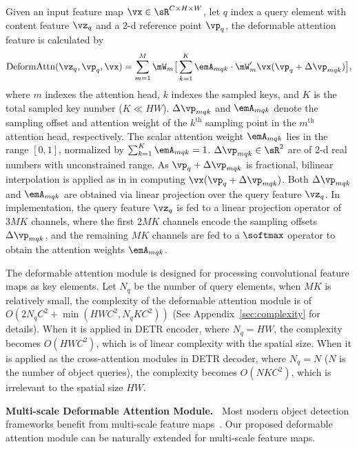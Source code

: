 Given an input feature map $\vx \in \sR^{C \times H \times W}$, let $q$ index a query element with content feature $\vz_q$ and a 2-d reference point $\vp_q$, the deformable attention feature is calculated by
\begin{equation}
\text{DeformAttn}(\vz_q, \vp_q, \vx) = \sum_{m=1}^{M} \mW_m \big[\sum_{k=1}^{K} \emA_{mqk} \cdot \mW'_m \vx(\vp_q + \Delta\vp_{mqk})\big],
\label{eq:single_deform_attn_fun}
\end{equation}
where $m$ indexes the attention head, $k$ indexes the sampled keys, and $K$ is the total sampled key number ($K \ll HW$).
$\Delta\vp_{mqk}$ and $\emA_{mqk}$ denote the sampling offset and attention weight of the $k^\text{th}$ sampling point in the $m^\text{th}$ attention head, respectively.
The scalar attention weight $\emA_{mqk}$ lies in the range $[0, 1]$, normalized by $\sum_{k=1}^{K} \emA_{mqk} = 1$. $\Delta\vp_{mqk} \in \sR^2$ are of 2-d real numbers with unconstrained range. As $\vp_q + \Delta\vp_{mqk}$ is
fractional, bilinear interpolation is applied as in \citet{dai2017deformable} in computing $\vx(\vp_q + \Delta\vp_{mqk})$. 
Both $\Delta\vp_{mqk}$ and $\emA_{mqk}$ are obtained via linear projection over the query feature $\vz_q$. In implementation, the query feature $\vz_q$ is fed to a linear projection operator of $3MK$ channels, where the first $2MK$ channels encode the sampling offsets $\Delta\vp_{mqk}$, and the remaining $MK$ channels are fed to a $\softmax$ operator to obtain the attention weights $\emA_{mqk}$.

The deformable attention module is designed for processing convolutional feature maps as key elements. Let $N_q$ be the number of query elements, when $MK$ is relatively small, the complexity of the deformable attention module is of $O(2N_qC^2 + \min(HWC^2, N_qKC^2))$ (See Appendix~\ref{sec:complexity} for details). When it is applied in DETR encoder, where $N_q = HW$, the complexity becomes $O(HWC^2)$, which is of linear complexity with the spatial size. When it is applied as the  cross-attention modules in DETR decoder, where $N_q = N$ ($N$ is the number of object queries), the complexity becomes $O(NKC^2)$, which is irrelevant to the spatial size $HW$.

\textbf{Multi-scale Deformable Attention Module.~}
Most modern object detection frameworks benefit from multi-scale feature maps~\citep{liu2020deep}. Our proposed deformable attention module can be naturally extended for multi-scale feature maps.

